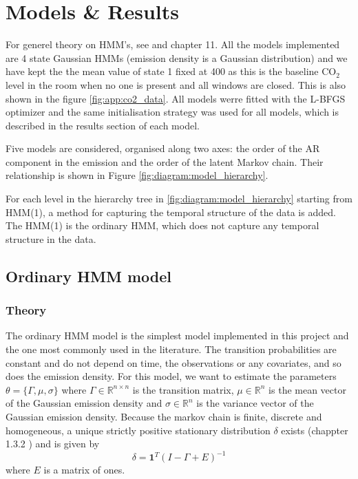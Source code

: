 \section{Models \& Results}
For generel theory on HMM's, see \citep{zucchini2016hidden} and \citep{moler2024statistical} chapter 11. 
All the models implemented are 4 state Gaussian HMMs (emission density is a Gaussian distribution) 
and we have kept the the mean value of state 1 fixed at 400 as this is the baseline $\text{CO}_2$ level in the room 
when no one is present and all windows are closed. This is also shown in the figure \ref{fig:app:co2_data}. All models werre
fitted with the L-BFGS optimizer and the same initialisation strategy was used for all models, which is described in the results section of each model.

Five models are considered, organised along two axes: the order of the AR
component in the emission and the order of the latent Markov chain. Their
relationship is shown in Figure \ref{fig:diagram:model_hierarchy}.

For each level in the hierarchy tree in \ref{fig:diagram:model_hierarchy} 
starting from HMM(1), a method for capturing the temporal 
structure of the data is added. 
The HMM(1) is the ordinary HMM, 
which does not capture any temporal structure in 
the data.

\newpage

\subsection{Ordinary HMM model}
\subsubsection{Theory}
The ordinary HMM model is the simplest model implemented in this project and the one most commonly used in the literature.
The transition probabilities are constant and do not depend on time, the observations or any covariates, and so does the emission density.
\newline
For this model, we want to estimate the parameters $\theta = \{\Gamma, \mu, \sigma\}$ 
where $\Gamma \in \mathbb{R}^{n \times n}$ is the transition matrix, $\mu \in \mathbb{R}^n$ 
is the mean vector of the Gaussian emission density and $\sigma \in \mathbb{R}^n$ 
is the variance vector of the Gaussian emission density.
Because the markov chain is finite, discrete and homogeneous, 
a unique strictly positive stationary distribution $\delta$ exists 
(chappter 1.3.2 \citep{zucchini2016hidden}) and is given by
\begin{equation}
    \delta=\mathbf{1}^T(I-\Gamma+E)^{-1}
    \label{eq:stationary_dist}
\end{equation}
where $E$ is a matrix of ones. \newline


